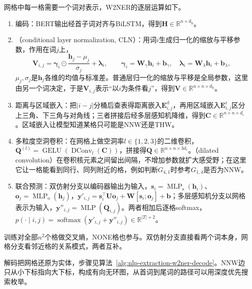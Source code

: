 网格中每一格需要一个词对表示，W2NER的逐层运算如下。
\begin{enumerate}
  \item 编码：BERT输出经首子词对齐与BiLSTM，得到$\bm H\in\mathbb R^{n\times d_{\mathrm h}}$。
  \item {}（conditional layer normalization, CLN）：用词$i$生成归一化的缩放与平移参数，作用在词$j$上，
  \[
    \bm V_{i,j}=\bm\gamma_{i}\odot\frac{\bm h_j-\mu_j}{\sigma_j}+\bm\lambda_{i},\qquad
    \bm\gamma_i=\bm W_{\gamma}\bm h_i+\bm b_{\gamma},\quad
    \bm\lambda_i=\bm W_{\lambda}\bm h_i+\bm b_{\lambda},
  \]
  $\mu_j,\sigma_j$是$\bm h_j$各维的均值与标准差。普通层归一化的缩放与平移是全局参数，这里由另一个词决定，于是$\bm V_{i,j}$表示“以$i$为条件看$j$”，得到$\bm V\in\mathbb R^{n\times n\times d_{\mathrm h}}$。
  \item 距离与区域嵌入：把$|i-j|$分桶后查表得距离嵌入$\bm E^{\mathrm d}_{i,j}$，再用区域嵌入$\bm E^{\mathrm r}_{i,j}$区分上三角、下三角与对角线；三者拼接后经多层感知机降维，得到$\bm C\in\mathbb R^{n\times n\times d_{\mathrm c}}$。区域嵌入让模型知道某格只可能是NNW还是THW。
  \item 多粒度空洞卷积：在网格上做空洞率$l\in\{1,2,3\}$的二维卷积，$\bm Q^{(l)}=\operatorname{GELU}(\operatorname{DConv}_l(\bm C))$，拼接得$\bm Q\in\mathbb R^{n\times n\times3d_{\mathrm c}}$。（dilated convolution）在卷积核元素之间留出间隔，不增加参数就扩大感受野；在这里它让一格能看到同行、同列附近的格，例如判断$G_{4,1}$时参考$G_{1,4}$是否为NNW。
  \item 联合预测：双仿射分支以编码器输出为输入，$\bm s_i=\operatorname{MLP}_{\mathrm s}(\bm h_i)$、$\bm o_j=\operatorname{MLP}_{\mathrm o}(\bm h_j)$，$\bm y'_{i,j}=\bm s_i^\top\bm U\bm o_j+\bm W[\bm s_i;\bm o_j]+\bm b$；多层感知机分支以网格表示为输入，$\bm y''_{i,j}=\operatorname{MLP}(\bm Q_{i,j})$。两者相加后逐格softmax，$p(\cdot\mid i,j)=\operatorname{softmax}(\bm y'_{i,j}+\bm y''_{i,j})\in\mathbb R^{|T|+2}$。
\end{enumerate}
训练对全部$n^2$个格做交叉熵，NONE格也参与。双仿射分支直接看两个词本身，网格分支看邻近格的关系模式，两者互补。

解码把网格还原为实体，步骤见算法~\ref{alg:nlp-extraction-w2ner-decode}。NNW边只从小下标指向大下标，构成有向无环图，从首词到尾词的路径可以用深度优先搜索枚举。

